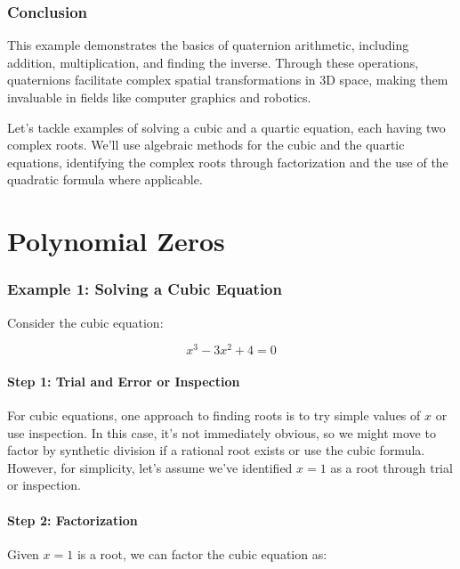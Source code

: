 \documentclass[
]{article}
\let\oldsection\section
\renewcommand{\section}[1]{\clearpage\oldsection{#1}}
\begin{document}
\subsubsection{Conclusion}\label{conclusion-4}

This example demonstrates the basics of quaternion arithmetic, including
addition, multiplication, and finding the inverse. Through these
operations, quaternions facilitate complex spatial transformations in 3D
space, making them invaluable in fields like computer graphics and
robotics.

Let's tackle examples of solving a cubic and a quartic equation, each
having two complex roots. We'll use algebraic methods for the cubic and
the quartic equations, identifying the complex roots through
factorization and the use of the quadratic formula where applicable.

\section{Polynomial Zeros}\label{polynomial-zeros}

\subsubsection{Example 1: Solving a Cubic
Equation}\label{example-1-solving-a-cubic-equation}

Consider the cubic equation:

\[ x^3 - 3x^2 + 4 = 0 \]

\paragraph{Step 1: Trial and Error or
Inspection}\label{step-1-trial-and-error-or-inspection}

For cubic equations, one approach to finding roots is to try simple
values of \(x\) or use inspection. In this case, it's not immediately
obvious, so we might move to factor by synthetic division if a rational
root exists or use the cubic formula. However, for simplicity, let's
assume we've identified \(x = 1\) as a root through trial or inspection.

\paragraph{Step 2: Factorization}\label{step-2-factorization}

Given \(x = 1\) is a root, we can factor the cubic equation as:
\end{document}
